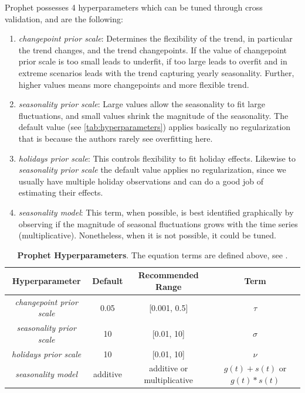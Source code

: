 Prophet possesses 4 hyperparameters which can be tuned through cross validation, and are the following:

\begin{enumerate}
\item \textit{changepoint prior scale}: Determines the flexibility of the trend, in particular the trend changes, and the trend changepoints. If the value of changepoint prior scale is too small leads to underfit, if too large leads to overfit and in extreme scenarios leads with the trend capturing yearly seasonality. Further, higher values means more changepoints and more flexible trend.
\item \textit{seasonality prior scale}: Large values allow the seasonality to fit large fluctuations, and small values shrink the magnitude of the seasonality. The default value (see \autoref{tab:hyperparameters}) applies basically no regularization that is because the authors rarely see overfitting here.  
\item \textit{holidays prior scale}: This controls flexibility to fit holiday effects. Likewise to \textit{seasonality prior scale} the default value applies no regularization, since we usually have multiple holiday observations and can do a good job of estimating their effects. 
\item \textit{seasonality model}: This term, when possible, is best identified graphically by observing if the magnitude of seasonal fluctuations grows with the time series (multiplicative). Nonetheless, when it is not possible, it could be tuned. 
\end{enumerate}

\begin{table}[!htb]
  \caption[Prophet Hyperparameters]{\textbf{Prophet Hyperparameters}. The equation terms are defined above, see .}
  \begin{scriptsize}
    \begin{tabulary}{0.65\linewidth}{cccc}
      \textbf{Hyperparameter} & \textbf{Default} & \textbf{Recommended Range} & \textbf{Term} \\ \hline
      \textit{changepoint prior scale} & 0.05 & [0.001, 0.5] & $\tau$  \\
      \textit{seasonality prior scale} & 10  & [0.01, 10] & $\sigma$  \\
      \textit{holidays prior scale} & 10  & [0.01, 10] & $\nu$ \\
      \textit{seasonality model} & additive  & additive or multiplicative & $g(t) + s(t)$ or  $g(t) * s(t)$ \\
    \end{tabulary}
  \end{scriptsize}
  \label{tab:hyperparameters}
\end{table}


